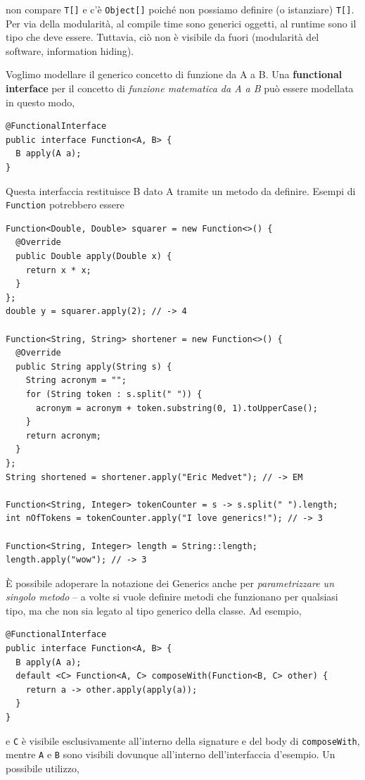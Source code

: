 \documentclass[\fontsizeclass,twocolumn]{\classname}
\theoremstyle{definition}
\theoremstyle{definition}
\begin{document}
non compare \texttt{T[]} e c'è \texttt{Object[]} poiché non possiamo definire
(o istanziare) \texttt{T[]}. Per via della modularità, al compile time sono
generici oggetti, al runtime sono il tipo che deve essere. Tuttavia, ciò non è
visibile da fuori (modularità del software, information hiding).

Voglimo modellare il generico concetto di funzione da A a B. Una
\textbf{functional interface} per il concetto di \emph{funzione matematica da A
a B} può essere modellata in questo modo, 

\begin{lstlisting}
@FunctionalInterface
public interface Function<A, B> {
  B apply(A a);
}
\end{lstlisting}

Questa interfaccia restituisce B dato A tramite un metodo da definire. Esempi di \texttt{Function} potrebbero essere

\begin{lstlisting}
Function<Double, Double> squarer = new Function<>() {
  @Override
  public Double apply(Double x) {
    return x * x;
  }
};
double y = squarer.apply(2); // -> 4

Function<String, String> shortener = new Function<>() {
  @Override
  public String apply(String s) {
    String acronym = "";
    for (String token : s.split(" ")) {
      acronym = acronym + token.substring(0, 1).toUpperCase();
    }
    return acronym;
  }
};
String shortened = shortener.apply("Eric Medvet"); // -> EM

Function<String, Integer> tokenCounter = s -> s.split(" ").length;
int nOfTokens = tokenCounter.apply("I love generics!"); // -> 3

Function<String, Integer> length = String::length;
length.apply("wow"); // -> 3
\end{lstlisting}

È possibile adoperare la notazione dei Generics anche per \emph{parametrizzare
un singolo metodo} -- a volte si vuole definire metodi che funzionano per
qualsiasi tipo, ma che non sia legato al tipo generico della classe. Ad esempio,

\begin{lstlisting}
@FunctionalInterface
public interface Function<A, B> {
  B apply(A a);
  default <C> Function<A, C> composeWith(Function<B, C> other) {
    return a -> other.apply(apply(a));
  }
}
\end{lstlisting}

e \texttt{C} è visibile esclusivamente all'interno della signature e del body
di \texttt{compose\-With}, mentre \texttt{A} e \texttt{B} sono visibili dovunque
all'interno dell'interfaccia d'esempio. Un possibile utilizzo,
\end{document}
